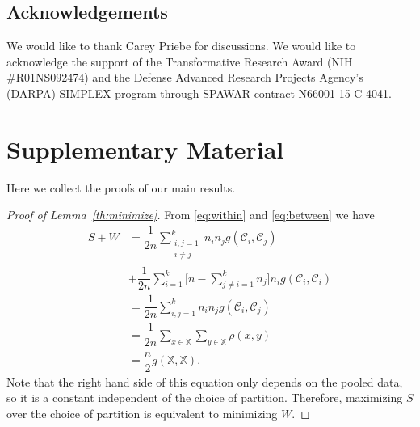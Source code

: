 \documentclass[twoside]{article}
\newcommand\C{{\mathcal{C}}}
\begin{document}
\subsection*{Acknowledgements}
We would like to thank Carey Priebe 
for discussions.
We would like to acknowledge the support of the Transformative
Research Award (NIH #R01NS092474) and  the Defense Advanced Research Projects
Agency’s (DARPA) SIMPLEX program through SPAWAR contract N66001-15-C-4041.


%
%



\clearpage

\appendix

\section{Supplementary Material}

Here we collect the proofs of our main results.

\begin{proof}[Proof of Lemma~\ref{th:minimize}]
From \eqref{eq:within} and \eqref{eq:between}
we have
\begin{equation}
\begin{split}
S + W &= 
\dfrac{1}{2n} \sum_{\substack{i,j=1 \\ i\ne j}}^k n_i n_j g(\C_i, \C_j)
\\&+ \dfrac{1}{2n} \sum_{i=1}^{k} 
\bigg[ n - 
\sum_{j\ne i = 1}^k n_j \bigg] 
n_i g(\C_i, \C_i) \\
& = \dfrac{1}{2n} \sum_{i,j=1}^k n_i n_j g(\C_i, \C_j) \\
&= \dfrac{1}{2n} \sum_{x \in \mathbb{X}} \sum_{y \in \mathbb{X}} \rho(x,y)\\
&= \dfrac{n}{2} g(\mathbb{X}, \mathbb{X}).
\end{split}
\end{equation}
Note that the right hand side of this equation 
only depends on the pooled data, so it is a constant
independent of the choice of partition. Therefore, maximizing
$S$ over the choice of partition is equivalent to minimizing $W$.
\end{proof}
\end{document}
